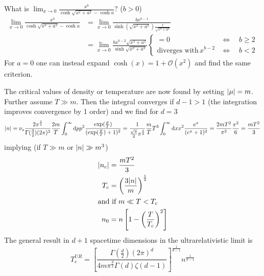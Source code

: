 What is $\lim_{x\to0}\frac{x^b}{\cosh\sqrt{x^2+a^2}-\cosh a}$? ($b>0$)
\begin{subequations}
    \begin{align}
        \lim_{x\to0}\frac{x^b}{\cosh\sqrt{x^2+a^2}-\cosh a} & =\lim_{x\to0}\frac{bx^{b-1}}{\sinh(\sqrt{x^2+a^2})\frac{x}{\sqrt{x^2+a^2}}} \\
                                                            & =\lim_{x\to0}\frac{bx^{b-2}\sqrt{x^2+a^2}}{\sinh\sqrt{x^2+a^2}}
        \begin{cases}
            =0                            & \iff\quad b\geq 2 \\
            \text{diverges with}\,x^{b-2} & \iff\quad b<2
        \end{cases}
    \end{align}
\end{subequations}
For $a=0$ one can instead expand $\cosh(x)=1+\mathcal{O}(x^2)$ and find the same criterion.

The critical values of density or temperature are now found by setting ${\vert\mu\vert}=m$. Further assume $T\gg m$. Then the integral converges if $d-1>1$ (the integration improves convergence by 1 order) and we find for $d=3$ 
\begin{equation}
    {\vert n\vert}=\nu_s\frac{2\pi^\frac{3}{2}}{\Gamma(\frac{3}{2})(2\pi)^3}\frac{2m}{T}\int_0^\infty\text{d} pp^2\frac{\exp(\frac{p}{T})}{(\exp(\frac{p}{T})+1)^2}=\frac{1}{\frac{\sqrt{\pi}}{2}\pi^\frac{3}{2}}\frac{m}{T}T^3\int_0^\infty\text{d} xx^2\frac{e^x}{(e^x+1)^2}=\frac{2mT^2}{\pi^2}\frac{\pi^2}{6}=\frac{mT^2}{3}
\end{equation}
implying (if $T\gg m$ or ${\vert n\vert}\gg m^3$)
\begin{subequations}
    \begin{align}
        {\vert n_c\vert} & =\frac{mT^2}{3}                                \\
        T_c       & =\left(\frac{3{\vert n\vert}}{m}\right)^{\frac{1}{2}} \\
        \intertext{and if $m\ll T<T_c$}
        n_0       & =n\left[1-\left(\frac{T}{T_c}\right)^2\right]
    \end{align}
\end{subequations}
The general result in $d+1$ spacetime dimensions in the ultrarelativistic limit is \cite{GretherEtAl_2007}
\begin{equation}
    T_c^{UR}=\left[\frac{\Gamma(\frac{d}{2})(2\pi)^d}{4m\pi^\frac{d}{2}\Gamma(d)\zeta(d-1)}\right]^\frac{1}{d-1}n^\frac{1}{d-1}
\end{equation}

